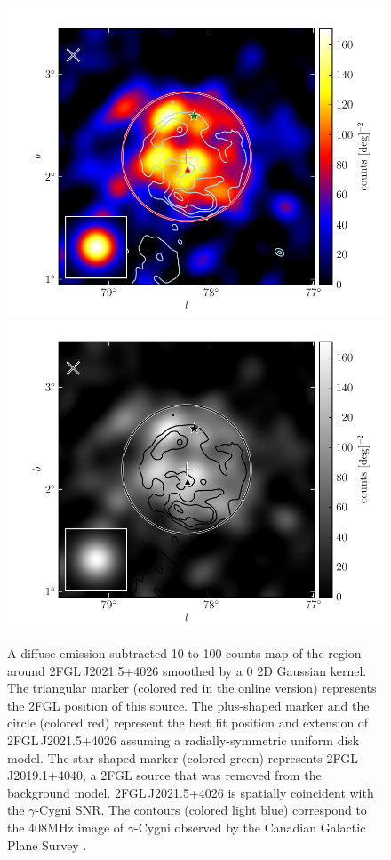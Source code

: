 \begin{figure}
    \ifcolorfigure
      \includegraphics{source_plots/source_Gamma_Cygni_color.pdf}
    \else
      \includegraphics{source_plots/source_Gamma_Cygni_bw.pdf}
    \fi
  \caption{A diffuse-emission-subtracted 
  10 \gev to 100 \gev counts map of the
  region around 2FGL\,J2021.5+4026 smoothed by a 0 2D Gaussian
  kernel. The triangular marker (colored red in the online version)
  represents the 2FGL position of this source.  The plus-shaped
  marker and the circle (colored red) represent the best fit position
  and extension of 2FGL\,J2021.5+4026 assuming a radially-symmetric
  uniform disk model.  
  The star-shaped marker (colored green)
  represents 2FGL\,J2019.1+4040,
  a 2FGL source that was removed from the background model.
  2FGL\,J2021.5+4026
  is spatially coincident with the $\gamma$-Cygni SNR.  The contours
  (colored light blue) correspond to the 408MHz image of $\gamma$-Cygni
  observed by the Canadian Galactic Plane Survey \citep{taylor_2003a_canadian-galactic}.
  }
\end{figure}


